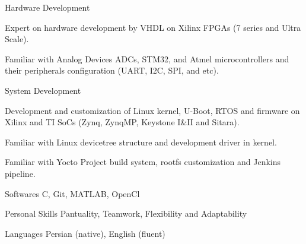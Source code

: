 


\begin{cvskills}


\cvskill
{Hardware Development} %
{
\item Expert on hardware development by VHDL on Xilinx FPGAs (7 series and Ultra Scale).
\item Familiar with Analog Devices ADCs, STM32, and Atmel microcontrollers and their peripherals configuration (UART, I2C, SPI, and etc).
}


\cvskill
{System Development} %
{
\item Development and customization of Linux kernel, U-Boot, RTOS and firmware on Xilinx and TI SoCs (Zynq, ZynqMP, Keystone I\&II and Sitara).
\item Familiar with Linux devicetree structure and development driver in kernel.
\item Familiar with Yocto Project build system, rootfs customization and Jenkins pipeline. 
}


\cvskill
{Softwares} %
{C, Git, MATLAB, OpenCl}


\cvskill
{Personal Skills} %
{Pantuality, Teamwork, Flexibility and Adaptability} %


\cvskill
{Languages} %
{Persian (native), English (fluent)} %


\end{cvskills}
